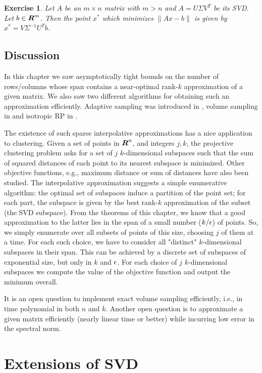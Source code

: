 \documentclass{book}
\newtheorem{exercise}{Exercise}
\numberwithin{exercise}{chapter}
\begin{document}
\begin{exercise}\label{ex:regression}
Let $A$ be an $m \times n$ matrix with $m > n$ and $A = U\Sigma V^T$ be its SVD. Let $b \in \mbox{\mbox{\boldmath $R$}}^m$.
Then the point $x^*$ which minimizes $\| Ax -b\|$ is given by $x^*= V\Sigma^{-1}U^Tb$.
\end{exercise}

\section{Discussion}

In this chapter we saw asymptotically tight bounds on the number of rows/columns whose span contains a near-optimal rank-$k$ approximation of a given matrix. We also saw two different algorithms for obtaining such an approximation efficiently. Adaptive sampling was introduced in \cite{DRVW06}, volume sampling in \cite{DV2006} and isotropic RP in \cite{Sarlos06}.

The existence of such sparse interpolative approximations has a nice application to clustering. Given a set of points in $\mbox{\mbox{\boldmath $R$}}^n$, and integers $j,k$, the projective clustering problem asks for a set of $j$ $k$-dimensional subspaces such that the sum of squared distances of each point to its nearest subspace is minimized. Other objective functions, e.g., maximum distance or sum of distances have also been studied. The interpolative approximation suggests a simple enumerative algorithm: the optimal set of subspaces induce a partition of the point set; for each part, the subspace is given by the best rank-$k$ approximation of the subset (the SVD subspace). From the theorems of this chapter, we know that a good approximation to the latter lies in the span of a small number ($k/\epsilon$) of points. So, we simply enumerate over all subsets of points of this size, choosing $j$ of them at a time. For each such choice, we have to consider all "distinct" $k$-dimensional subspaces in their span. This can be achieved by a discrete set of subspaces of exponential size, but only in $k$ and $\epsilon$. For each choice of $j$ $k$-dimensional subspaces we compute the value of the objective function and output the minimum overall.

It is an open question to implement exact volume sampling efficiently, i.e., in time polynomial in both $n$ and $k$. Another open question is to approximate a given matrix efficiently (nearly linear time or better) while incurring low error in the spectral norm.

\chapter{Extensions of SVD}\label{chap:extensions}
\end{document}
